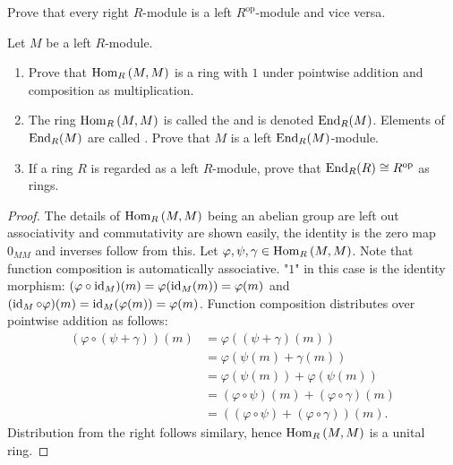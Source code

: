     \begin{exercise}
        Prove that every right $R$-module is a left $R^\text{op}$-module and vice versa.
    \end{exercise}

    \begin{exercise}\label{exer:1-8}
        Let $M$ be a left $R$-module.
        \begin{enumerate}[label = (\roman*)]
            \item Prove that $\operatorname{Hom}_R{(M,M)}$ is a ring with $1$ under pointwise addition and composition as multiplication.
            \item The ring $\operatorname{Hom}_R{(M,M)}$ is called the  and is denoted $\operatorname{End}_R(M)$. Elements of $\operatorname{End}_R(M)$ are called . Prove that $M$ is a left $\operatorname{End}_R(M)$-module.
            \item If a ring $R$ is regarded as a left $R$-module, prove that $\operatorname{End}_R(R) \cong R^\text{op}$ as rings.
        \end{enumerate}
    \end{exercise}
        {\color{red} \begin{proof}
            The details of $\operatorname{Hom}_R{(M,M)}$ being an abelian group are left out \textemdash associativity and commutativity are shown easily, the identity is the zero map $0_{MM}$ and inverses follow from this. Let $\varphi,\psi, \gamma \in \operatorname{Hom}_R{(M,M)}$. Note that function composition is automatically associative. "$1$" in this case is the identity morphism: $(\varphi \circ \operatorname{id}_{M})(m) = \varphi(\operatorname{id}_M(m)) = \varphi(m)$ and $(\operatorname{id}_M \circ \varphi)(m) = \operatorname{id}_M(\varphi(m)) = \varphi(m)$. Function composition distributes over pointwise addition as follows:
                \begin{equation*}
                \begin{split}
                    (\varphi \circ (\psi + \gamma))(m)
                    & = \varphi((\psi + \gamma)(m)) \\
                    & = \varphi(\psi(m) + \gamma(m)) \\
                    & = \varphi(\psi(m)) + \varphi(\psi(m))\\
                    & = (\varphi \circ \psi)(m) + (\varphi \circ \gamma)(m)\\
                    & = ((\varphi \circ \psi) + (\varphi \circ \gamma))(m).
                \end{split}
                \end{equation*}
            Distribution from the right follows similary, hence $\operatorname{Hom}_R{(M,M)}$ is a unital ring.


        \end{proof}}
